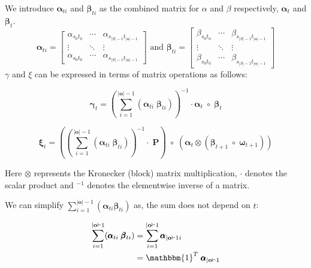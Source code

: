We introduce $\pmb{\alpha}_{t i}$ and $\pmb{\beta}_{t i}$ as the combined matrix for $\alpha$ and $\beta$ respectively, $\pmb{\alpha}_t$ and $\pmb{\beta}_t$.
\begin{equation}
    \pmb{\alpha}_{t i} = 
        \begin{bmatrix}
            \alpha_{s_0t_{0}}  & \cdots & \alpha_{s_{|S|-1}t_{|\textbf{o}|-1}} \\
            \vdots               & \ddots & \vdots                      \\
            \alpha_{s_0t_{0}}  & \cdots & \alpha_{s_{|S|-1}t_{|\textbf{o}|-1}}
        \end{bmatrix}
        \text{ and }
    \pmb{\beta}_{t i} = 
        \begin{bmatrix}
            \beta_{s_0t_{0}}  & \cdots & \beta_{s_{|S|-1}t_{|\textbf{o}|-1}} \\
            \vdots               & \ddots & \vdots                      \\
            \beta_{s_0t_{0}}  & \cdots & \beta_{s_{|S|-1}t_{|\textbf{o}|-1}}
        \end{bmatrix}
\end{equation}
$\gamma$ and $\xi$ can be expressed in terms of matrix operations as follows:

\begin{equation}
\pmb{\gamma}
    _t = (\sum_{i=1}^{|\mathbf{o}|-1} (\pmb{\alpha}_{t i} \;\pmb{\beta}_{t i}))^{-1} \cdot \pmb{\alpha}_t \; \circ \; \pmb{\beta}_t
    \label{eq:gamma-matrix}
\end{equation}

\begin{equation}
\pmb{\xi}
    _t = ((\sum_{i=1}^{|\mathbf{o}|-1} (\pmb{\alpha}_{t i} \; \pmb{\beta}_{t i}))^{-1} \cdot \; \pmb{P}) \; \circ \;(\pmb{\alpha}_t \otimes (\pmb{\beta}_{t+1} \; \circ \; \pmb{\omega}_{t+1}))
    \label{eq:xi-matrix}
\end{equation}

Here $\otimes$ represents the Kronecker (block) matrix multiplication, $\cdot$ denotes the scalar product and $^{-1}$ denotes the elementwise inverse of a matrix.

We can simplify $\sum_{i=1}^{|\mathbf{o}|-1} (\pmb{\alpha}_{t i} \pmb{\beta}_{t i})$ as, the sum does not depend on $t$:

\begin{align}
    \sum_{i=1}^{|\mathbf{o}|-1} (\pmb{\alpha}_{t i} \; \pmb{\beta}_{t i}) &= \sum_{i=1}^{|\mathbf{o}|-1} \pmb{\alpha}_{|\mathbf{o}|-1 i} \\
    &= \mathbbm{1}^T \; \pmb{\alpha}_{|\mathbf{o}|-1}
\end{align}

